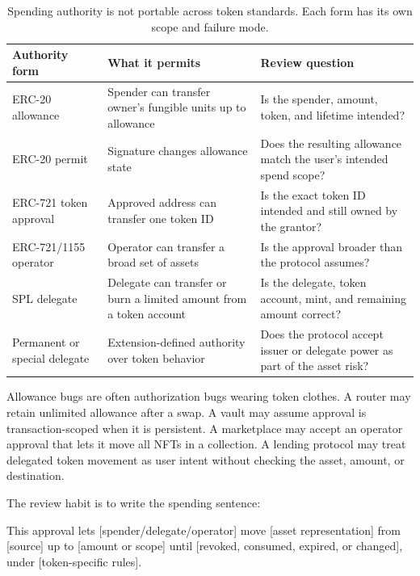 \begin{table}[htbp]
\centering
\small
\renewcommand{\arraystretch}{1.16}
\begin{tabularx}{\textwidth}{@{}>{\RaggedRight\arraybackslash}p{}>{\RaggedRight\arraybackslash}p{}X@{}}
\toprule
Authority form & What it permits & Review question \\
\midrule
ERC-20 allowance & Spender can transfer owner's fungible units up to allowance & Is the spender, amount, token, and lifetime intended? \\
ERC-20 permit & Signature changes allowance state & Does the resulting allowance match the user's intended spend scope? \\
ERC-721 token approval & Approved address can transfer one token ID & Is the exact token ID intended and still owned by the grantor? \\
ERC-721/1155 operator & Operator can transfer a broad set of assets & Is the approval broader than the protocol assumes? \\
SPL delegate & Delegate can transfer or burn a limited amount from a token account & Is the delegate, token account, mint, and remaining amount correct? \\
Permanent or special delegate & Extension-defined authority over token behavior & Does the protocol accept issuer or delegate power as part of the asset risk? \\
\bottomrule
\end{tabularx}
\caption{Spending authority is not portable across token standards. Each form has its own scope and failure mode.}
\end{table}

Allowance bugs are often authorization bugs wearing token clothes. A router may retain unlimited allowance after a swap. A vault may assume approval is transaction-scoped when it is persistent. A marketplace may accept an operator approval that lets it move all NFTs in a collection. A lending protocol may treat delegated token movement as user intent without checking the asset, amount, or destination.

The review habit is to write the spending sentence:

\begin{codeblock}
This approval lets [spender/delegate/operator]
move [asset representation]
from [source]
up to [amount or scope]
until [revoked, consumed, expired, or changed],
under [token-specific rules].
\end{codeblock}

